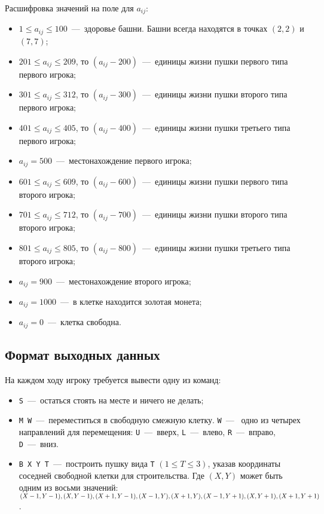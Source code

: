 \documentclass[14pt]{extarticle}
\begin{document}
Расшифровка значений на поле для $a_{ij}$:
\begin{itemize}
    \item $1 \leq a_{ij} \leq 100$~---~здоровье башни. Башни всегда находятся в точках $(2, 2)$ и $(7, 7)$;
    \item $201 \leq a_{ij} \leq 209$, то $(a_{ij} - 200)$~---~единицы жизни пушки первого типа первого игрока;
    \item $301 \leq a_{ij} \leq 312$, то $(a_{ij} - 300)$~---~единицы жизни пушки второго типа первого игрока;
    \item $401 \leq a_{ij} \leq 405$, то $(a_{ij} - 400)$~---~единицы жизни пушки третьего типа первого игрока;
    \item $a_{ij} = 500$~---~местонахождение первого игрока;
    \item $601 \leq a_{ij} \leq 609$, то $(a_{ij} - 600)$~---~единицы жизни пушки первого типа второго игрока;
    \item $701 \leq a_{ij} \leq 712$, то $(a_{ij} - 700)$~---~единицы жизни пушки второго типа второго игрока;
    \item $801 \leq a_{ij} \leq 805$, то $(a_{ij} - 800)$~---~единицы жизни пушки третьего типа второго игрока;
    \item $a_{ij} = 900$~---~местонахождение второго игрока;
    \item $a_{ij} = 1000$~---~в клетке находится золотая монета;
    \item $a_{ij} = 0$~---~клетка свободна.
\end{itemize}

\subsection*{Формат выходных данных}
На каждом ходу игроку требуется вывести одну из команд:
\begin{itemize}
    \item \texttt{S}~---~остаться стоять на месте и ничего не делать;
    \item \texttt{M W}~---~переместиться в свободную смежную клетку. \texttt{W}~---~ одно из четырех направлений для перемещения: \texttt{U}~---~вверх, \texttt{L}~---~влево, \texttt{R}~---~вправо, \texttt{D}~---~вниз.
    \item \texttt{B X Y T}~---~построить пушку вида \texttt{T} $(1 \leq T \leq 3)$, указав координаты соседней свободной клетки для строительства. Где $(X, Y)$ может быть одним из восьми значений: $(X - 1, Y - 1), (X, Y - 1), (X + 1, Y - 1), (X - 1, Y), \\ (X + 1, Y), (X - 1, Y + 1), (X, Y + 1), (X + 1, Y + 1)$.
\end{itemize}
\end{document}
